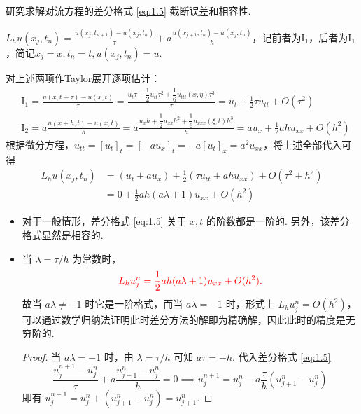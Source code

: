 \begin{instance}[]
    研究求解对流方程的差分格式 \eqref{eq:1.5} 截断误差和相容性.\par
    $L_hu(x_j,t_n)=\frac{u(x_j,t_{n+1})-u(x_j,t_n)}{\tau}+a\frac{u(x_{j+1},t_n)-u(x_j,t_n)}{h}$，记前者为$\mathrm{I}_1$，后者为$\mathrm{I}_1$，简记$x_j=x,t_n=t,u(x_j,t_n)=u$.\par
    对上述两项作Taylor展开逐项估计：
    \begin{align*}
        &\mathrm{I}_1=\frac{u(x,t+\tau)-u(x,t)}{\tau}=\frac{u_t\tau+\dfrac{1}{2}u_{tt}\tau^2+\dfrac{1}{6}u_{ttt}(x,\eta)\tau^3}{\tau}=u_t + \frac{1}{2}\tau u_{tt} + O(\tau^2) \\
        &\mathrm{I}_2=a\frac{u(x+h,t)-u(x,t)}{h}=a\frac{u_xh+\dfrac{1}{2}u_{xx}h^2+\dfrac{1}{6}u_{xxx}(\xi,t)h^3}{h}=au_x + \frac{1}{2}ah u_{xx} + O(h^2)
    \end{align*}
    根据微分方程，$u_{tt}=[u_t]_t=[-au_x]_t=-a[u_t]_x=a^2u_{xx}$，将上述全部代入可得
    \begin{align*}
        L_h u(x_j,t_n)&=(u_t+au_x)+\frac{1}{2}(\tau u_{tt}+ ahu_{xx}) + O(\tau^2 + h^2) \\
        &=0+\frac{1}{2}ah(a\lambda + 1)u_{xx} + O(h^2)
    \end{align*}

    \begin{itemize}
    \item 对于一般情形，差分格式 \eqref{eq:1.5} 关于 $x, t$ 的阶数都是一阶的. 另外，该差分格式显然是相容的.
    \item 当 $\lambda = \tau/h$ 为常数时，
    \[ {\color{red} L_h u_j^n = \frac{1}{2}ah(a\lambda + 1)u_{xx} + O(h^2). } \]
    故当 $a\lambda \neq -1$ 时它是一阶格式，而当 $a\lambda = -1$ 时，形式上 $L_h u_j^n = O(h^2)$，可以通过数学归纳法证明此时差分方法的解即为精确解，因此此时的精度是无穷阶的.
    
    \begin{proof}
        当 $a\lambda = -1$ 时，由 $\lambda = \tau/h$ 可知 $a\tau = -h$. 代入差分格式 \eqref{eq:1.5}
        \[ \frac{u_j^{n+1} - u_j^n}{\tau} + a\frac{u_{j+1}^n - u_j^n}{h} = 0 \implies u_j^{n+1} = u_j^n - a\frac{\tau}{h}(u_{j+1}^n - u_j^n) \]
        即有 $u_j^{n+1} = u_j^n + (u_{j+1}^n - u_j^n) = u_{j+1}^n$. 
        

\end{proof}
\end{itemize}
\end{instance}
